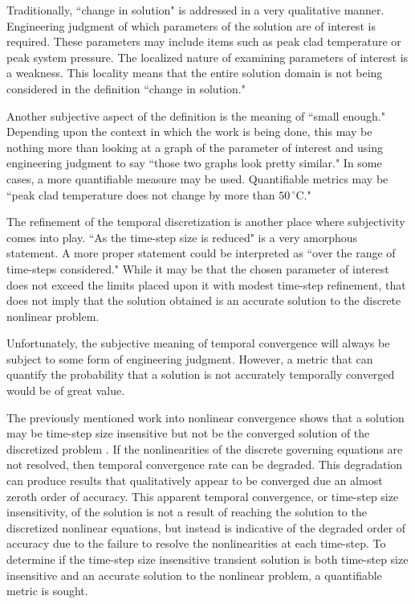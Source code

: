 Traditionally, ``change in solution" is addressed in a very qualitative manner.
Engineering judgment of which parameters of the solution are of interest is required.
These parameters may include items such as peak clad temperature or peak system pressure.
The localized nature of examining parameters of interest is a weakness.
This locality means that the entire solution domain is not being considered in the definition ``change in solution."

Another subjective aspect of the definition is the meaning of ``small enough."
Depending upon the context in which the work is being done, this may be nothing more than looking at a graph of the parameter of interest and using engineering judgment to say ``those two graphs look pretty similar."
In some cases, a more quantifiable measure may be used.
Quantifiable metrics may be  ``peak clad temperature does not change by more than $50\,^{\circ}\mathrm{C}$."

The refinement of the temporal discretization is another place where subjectivity comes into play.
``As the time-step size is reduced" is a very amorphous statement.
A more proper statement could be interpreted as ``over the range of time-steps considered."
While it may be that the chosen parameter of interest does not exceed the limits placed upon it with modest time-step refinement, that does not imply that the solution obtained is an accurate solution to the discrete nonlinear problem.

Unfortunately, the subjective meaning of temporal convergence will always be subject to some form of engineering judgment. However, a metric that can quantify the probability that a solution is not accurately temporally converged would be of great value.

The previously mentioned work into nonlinear convergence shows that a solution may be time-step size insensitive but not be the converged solution of the discretized problem \cite{Knoll2001}.
If the nonlinearities of the discrete governing equations are not resolved, then temporal convergence rate can be degraded.
This degradation can produce results that qualitatively appear to be converged due an almost zeroth order of accuracy.
This apparent temporal convergence, or time-step size insensitivity, of the solution is not a result of reaching the solution to the discretized nonlinear equations, but instead is indicative of the degraded order of accuracy due to the failure to resolve the nonlinearities at each time-step.
To determine if the time-step size insensitive transient solution is both time-step size insensitive and an accurate solution to the nonlinear problem, a quantifiable metric is sought.

